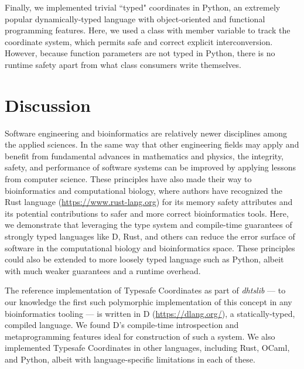 \documentclass[12pt]{article}
\begin{document}
Finally, we implemented trivial ``typed" coordinates in Python, an extremely popular dynamically-typed language with object-oriented and functional programming features. Here, we used a class with member variable to track the coordinate system, which permits safe and correct explicit interconversion. However, because function parameters are not typed in Python, there is no runtime safety apart from what class consumers write themselves.

\section*{Discussion}   %

Software engineering and bioinformatics are relatively newer disciplines among the applied sciences. In the same way that other engineering fields may apply and benefit from fundamental advances in mathematics and physics, the integrity, safety, and performance of software systems can be improved by applying lessons from computer science. These principles have also made their way to bioinformatics and computational biology, where authors have recognized the Rust language (\url{https://www.rust-lang.org}) for its memory safety attributes and its potential contributions to safer and more correct bioinformatics tools.\cite{koster_rust-bio_2016,perkel_why_2020}  Here, we demonstrate that leveraging the type system and compile-time guarantees of strongly typed languages like D, Rust, and others can reduce the error surface of software in the computational biology and bioinformatics space. These principles could also be extended to more loosely typed language such as Python, albeit with much weaker guarantees and a runtime overhead.

The reference implementation of Typesafe Coordinates as part of \mbox{\textit{dhtslib}\cite{gregory_dhtslib_nodate}} --- to our knowledge the first such polymorphic implementation of this concept in any bioinformatics tooling --- is written in D (\url{https://dlang.org/}), a statically-typed, compiled language. We found D's compile-time introspection and metaprogramming features ideal for construction of such a system. We also implemented Typesafe Coordinates in other languages, including Rust, OCaml, and Python, albeit with language-specific limitations in each of these.
\end{document}
